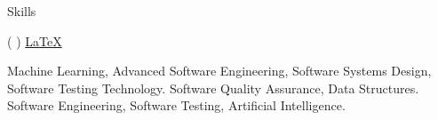 
\begin{rubric}{Skills}
    
	\href{https://developer.mozilla.org/en-US/docs/Glossary/HTML5}{{\color{faHTML5}}}
	\href{https://developer.mozilla.org/en-US/docs/Web/CSS}{{\color{faCSS3}}}
	\href{https://getbootstrap.com/}{{\color{faBootstrap}\faBootstrap}}
	\href{https://developer.mozilla.org/en-US/docs/Web/JavaScript}{{\color{faJS}\faJs}}
	(\href{https://reactjs.org/}{{\color{faReact}\faReact}}
	\href{https://nodejs.org/en/}{{\color{faNode}\faNodeJs}})
	\href{https://www.python.org/}{{\color{faPython}\faPython}}
	\href{https://www.java.com/en/}{{\color{faJava}\faJava}}
	\href{https://www.php.net/}{{\color{faPHP}\faPhp}}
	\href{https://www.latex-project.org/}{\LaTeX}
	 
\entry*[Coursework]
Machine Learning, Advanced Software Engineering, Software Systems Design, Software Testing Technology. Software Quality Assurance,  Data Structures.
Software Engineering, Software Testing, Artificial Intelligence.
\end{rubric}

